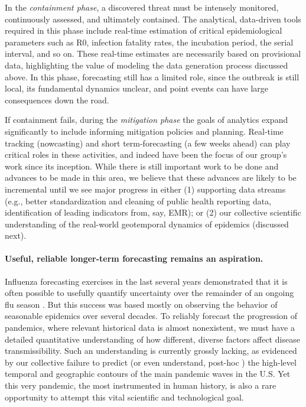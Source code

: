 \documentclass{article}
\begin{document}
In the \emph{containment phase}, a discovered threat must be intensely
monitored, continuously assessed, and ultimately contained.  The analytical,
data-driven tools required in this phase include real-time estimation of
critical epidemiological parameters such as R0, infection fatality rates, the
incubation period, the serial interval, and so on.  These real-time estimates
are necessarily based on provisional data, highlighting the value of modeling
the data generation process discussed above.  In this phase, forecasting still
has a limited role, since the outbreak is still local, its fundamental dynamics
unclear, and point events can have large consequences down the road. 

If containment fails, during the \emph{mitigation phase} the goals of analytics
expand significantly to include informing mitigation policies and planning.
Real-time tracking (nowcasting) and short term-forecasting (a few weeks
ahead) can play critical roles in these activities, and indeed have been the
focus of our group's work since its inception.  While there is still important
work to be done and advances to be made in this area, we believe that these
advances are likely to be incremental until we see major progress in either (1)
supporting data streams (e.g., better standardization and cleaning of public
health reporting data, identification of leading indicators from, say, EMR); or
(2) our collective scientific understanding of the real-world geotemporal
dynamics of epidemics (discussed next).

\paragraph{Useful, reliable longer-term forecasting remains an aspiration.}

Influenza forecasting exercises in the last several years demonstrated that it
is often possible to usefully quantify uncertainty over the remainder of an
ongoing flu season \citep{Reich:2019}.  But this success was based mostly on
observing the behavior of seasonable epidemics over several decades.  To
reliably forecast the progression of pandemics, where relevant historical data
is almost nonexistent, we must have a detailed quantitative understanding of how
different, diverse factors affect disease transmissibility.  Such an 
understanding is currently grossly lacking, as evidenced by our collective
failure to predict \citep{Reich:2021} (or even understand, post-hoc
\citep{Hawre:2021}) the high-level temporal and geographic contours of the main
pandemic waves in the U.S.  Yet this very pandemic, the most instrumented in
human history, is also a rare opportunity to attempt this vital scientific and
technological goal.
\end{document}
